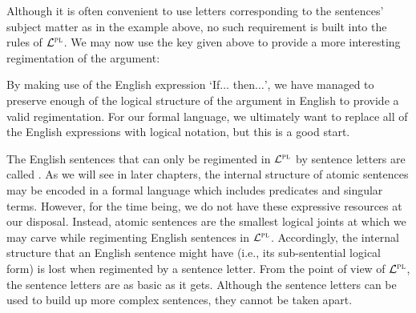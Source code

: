 Although it is often convenient to use letters corresponding to the sentences' subject matter as in the example above, no such requirement is built into the rules of $\mathcal{L}^{\textsc{pl}}$.
We may now use the key given above to provide a more interesting regimentation of the argument:

\begin{earg}
\end{earg}

By making use of the English expression `If$\ldots$ then$\ldots$', we have managed to preserve enough of the logical structure of the argument in English to provide a valid regimentation.
For our formal language, we ultimately want to replace all of the English expressions with logical notation, but this is a good start.

The English sentences that can only be regimented in $\mathcal{L}^{\textsc{pl}}$ by sentence letters are called .
As we will see in later chapters, the internal structure of atomic sentences may be encoded in a formal language which includes predicates and singular terms.
However, for the time being, we do not have these expressive resources at our disposal.
Instead, atomic sentences are the smallest logical joints at which we may carve while regimenting English sentences in $\mathcal{L}^{\textsc{pl}}$.
Accordingly, the internal structure that an English sentence might have (i.e., its sub-sentential logical form) is lost when regimented by a sentence letter.
From the point of view of $\mathcal{L}^{\textsc{pl}}$, the sentence letters are as basic as it gets.
Although the sentence letters can be used to build up more complex sentences, they cannot be taken apart.



